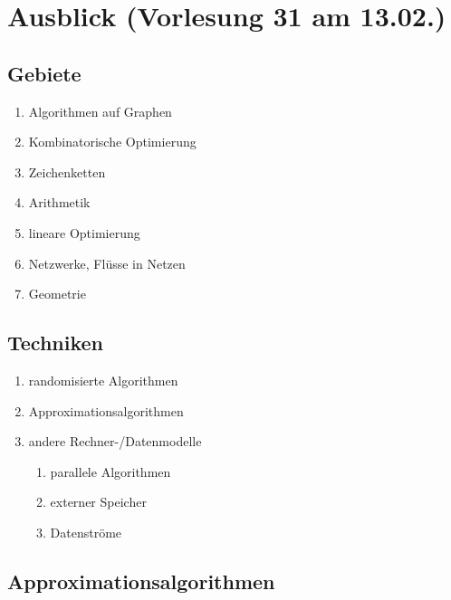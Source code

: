 \section{Ausblick \tiny (Vorlesung 31 am 13.02.)}
\subsection{Gebiete}
\begin{enumerate}
\item Algorithmen auf Graphen
\item Kombinatorische Optimierung
\item Zeichenketten
\item Arithmetik
\item lineare Optimierung
\item Netzwerke, Flüsse in Netzen
\item Geometrie
\end{enumerate}
\subsection{Techniken}
\begin{enumerate}
\item randomisierte Algorithmen
\item Approximationsalgorithmen
\item andere Rechner-/Datenmodelle
\begin{enumerate}
\item parallele Algorithmen
\item externer Speicher
\item Datenströme
\end{enumerate}
\end{enumerate}

\subsection{Approximationsalgorithmen}
